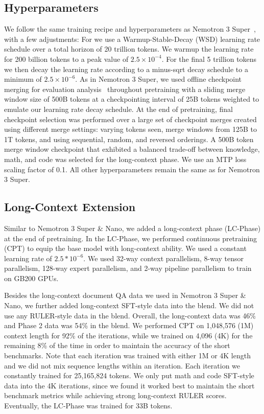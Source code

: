 \subsection{Hyperparameters}
\label{sec:hyperparameters}
We follow the same training recipe and hyperparameters as Nemotron 3 Super~\citep{nvidia2026nemotron3superopen}, with a few adjustments: For \ourmodel we use a Warmup-Stable-Decay (WSD) learning rate schedule over a total horizon of 20 trillion tokens. We warmup the learning rate for 200 billion tokens to a peak value of $2.5 \times 10^{-4}$. For the final 5 trillion tokens we then decay the learning rate according to a minus-sqrt decay schedule to a minimum of $2.5 \times 10^{-6}$. 
As in Nemotron 3 Super, we used offline checkpoint merging for evaluation analysis~\citep{tian2025wsm} throughout pretraining with a sliding merge window size of 500B tokens at a checkpointing interval of 25B tokens weighted to emulate our learning rate decay schedule.
At the end of pretraining, final checkpoint selection was performed over a large set of checkpoint merges created using different merge settings: varying tokens seen, merge windows from 125B to 1T tokens, and using sequential, random, and reversed orderings. A 500B token merge window checkpoint that exhibited a balanced trade-off between knowledge, math, and code was selected for the long-context phase.
We use an MTP loss scaling factor of 0.1. All other hyperparameters remain the same as for Nemotron 3 Super. 

\subsection{Long-Context Extension}

Similar to Nemotron 3 Super \& Nano, we added a long-context phase (LC-Phase) at the end of pretraining. In the LC-Phase, we performed continuous pretraining (CPT) to equip the base model with long-context ability. We used a constant learning rate of $2.5*10^{-6}$. We used 32-way context parallelism, 8-way tensor parallelism, 128-way expert parallelism, and 2-way pipeline parallelism to train on GB200 GPUs.

Besides the long-context document QA data we used in Nemotron 3 Super \& Nano, we further added long-context SFT-style data into the blend. We did not use any RULER-style data in the blend. Overall, the long-context data was 46\% and Phase 2 data was 54\% in the blend. We performed CPT on 1,048,576 (1M) context length for 92\% of the iterations, while we trained on 4,096 (4K) for the remaining 8\% of the time in order to maintain the accuracy of the short benchmarks. Note that each iteration was trained with either 1M or 4K length and we did not mix sequence lengths within an iteration. Each iteration we constantly trained for 25,165,824 tokens. We only put math and code SFT-style data into the 4K iterations, since we found it worked best to maintain the short benchmark metrics while achieving strong long-context RULER scores. Eventually, the LC-Phase was trained for 33B tokens.

